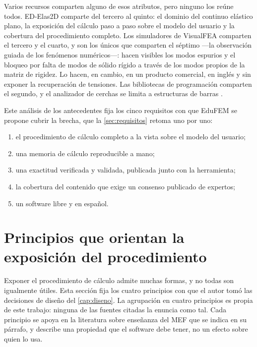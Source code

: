 Varios recursos comparten alguno de esos atributos, pero ninguno los reúne todos. \mbox{ED-Elas2D} comparte del tercero al quinto: el dominio del continuo elástico plano, la exposición del cálculo paso a paso sobre el modelo del usuario y la cobertura del procedimiento completo. Los simuladores de VisualFEA comparten el tercero y el cuarto, y son los únicos que comparten el séptimo ---la observación guiada de los fenómenos numéricos---: hacen visibles los modos espurios y el bloqueo por falta de modos de sólido rígido a través de los modos propios de la matriz de rigidez. Lo hacen, en cambio, en un producto comercial, en inglés y sin exponer la recuperación de tensiones. Las bibliotecas de programación comparten el segundo, y el analizador de cerchas se limita a estructuras de barras \autocite[p.~1023]{bishay2020teaching}.

Este análisis de los antecedentes fija los cinco requisitos con que EduFEM se propone cubrir la brecha, que la \autoref{sec:requisitos} retoma uno por uno:

\begin{enumerate}
    \item el procedimiento de cálculo completo a la vista sobre el modelo del usuario;
    \item una memoria de cálculo reproducible a mano;
    \item una exactitud verificada y validada, publicada junto con la herramienta;
    \item la cobertura del contenido que exige un consenso publicado de expertos;
    \item un software libre y en español.
\end{enumerate}

\section{Principios que orientan la exposición del procedimiento}
\label{sec:fundamentos-pedagogicos}

Exponer el procedimiento de cálculo admite muchas formas, y no todas son igualmente útiles. Esta sección fija los cuatro principios con que el autor tomó las decisiones de diseño del \autoref{cap:diseno}. La agrupación en cuatro principios es propia de este trabajo: ninguna de las fuentes citadas la enuncia como tal. Cada principio se apoya en la literatura sobre enseñanza del MEF que se indica en su párrafo, y describe una propiedad que el software debe tener, no un efecto sobre quien lo usa.

